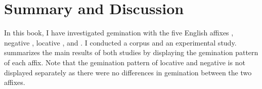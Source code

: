 \chapter{Summary and Discussion} \label{Conclusion}

In this book, I have investigated gemination with the five English affixes , negative , locative ,  and . I conducted a corpus and an experimental study. 
 summarizes the main results of both studies by displaying the gemination pattern of each affix. Note that the gemination pattern of locative and negative  is not displayed separately as there were no differences in gemination between the two affixes. 





\begin{table*}
	\caption{Overview of gemination in corpus and experimental study}
	\label{tbl:Overview gemination in corpus and experimental study}
	
 
		\renewcommand{\arraystretch}{1.5}
 
\end{table*}



